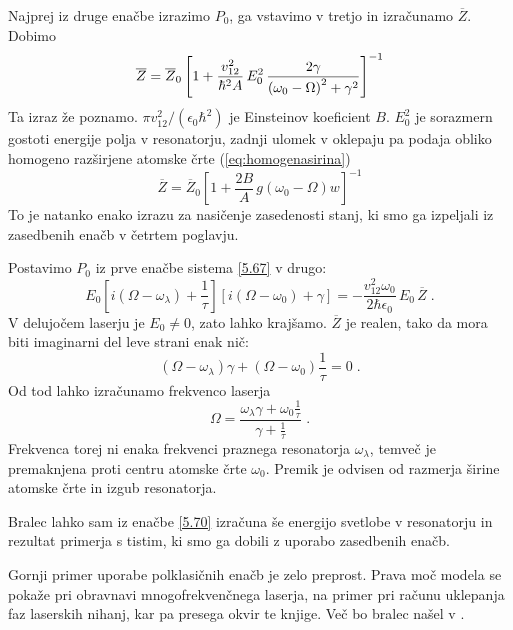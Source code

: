 Najprej iz druge enačbe izrazimo $P_0$, ga vstavimo v tretjo in izračunamo $\overline{Z}$. Dobimo
\begin{equation}  
\label{5.68}
\overline{Z}=\overline{Z}_0\left[1+\frac{v_{12}^2}{\hbar^2 A}\,E_0^2\, \frac{2\gamma}{%
\left(\omega_0-\Omega\right)^2+\gamma^2}\right]^{-1}
\end{equation}
Ta izraz že poznamo. $\pi v_{12}^2/\left(\epsilon_0\hbar^2\right)$ je Einsteinov
koeficient $B$. $E_0^2$ je sorazmern gostoti energije polja v resonatorju,
zadnji ulomek v oklepaju pa podaja obliko homogeno razširjene atomske
črte (\ref{eq:homogenasirina})
\begin{equation}  \label{5.69}
\overline{Z}=\overline{Z}_0\left[1+\frac{2B}{A}\,g\left(\omega_0- \Omega\right)w\right]^{-1}
\end{equation}
To je natanko enako izrazu za nasičenje zasedenosti stanj, ki smo ga
izpeljali iz zasedbenih enačb v četrtem poglavju.

Postavimo $P_0$ iz prve enačbe sistema \ref{5.67} v drugo: 
\begin{equation}  \label{5.70}
E_0[i\left(\Omega-\omega_{\lambda}\right)+\frac{1}{\tau}] [i\left(\Omega- \omega_0\right)
+\gamma]=-\frac{v_{12}^2 \omega_0}{2\hbar\epsilon_0}\,E_0\,\overline{Z}\;.
\end{equation}
V delujočem laserju je $E_0\ne 0$, zato lahko krajšamo. $\overline{Z}$ je
realen, tako da mora biti imaginarni del leve strani enak nič: 
\begin{equation}  \label{5.71}
\left(\Omega- \omega_{\lambda}\right)\gamma+\left(\Omega- \omega_0\right)\frac{1}{\tau} = 0 \;.
\end{equation}
Od tod lahko izračunamo frekvenco laserja 
\begin{equation}  \label{5.72}
\Omega=\frac{\omega_{\lambda}\gamma+ \omega_0\frac{1}{\tau}}{\gamma + \frac{1%
}{\tau}}\;.
\end{equation}
Frekvenca torej ni enaka frekvenci praznega resonatorja $\omega_{\lambda}$,
temveč je premaknjena proti centru atomske črte $\omega_0$. Premik je
odvisen od razmerja širine atomske črte in izgub resonatorja.

Bralec lahko sam iz enačbe \ref{5.70} izračuna še energijo svetlobe v
resonatorju in rezultat primerja s tistim, ki smo ga dobili z uporabo
zasedbenih enačb.

Gornji primer uporabe polklasičnih enačb je zelo preprost. Prava moč
modela se pokaže pri obravnavi mnogofrekvenčnega laserja, na primer pri
računu uklepanja faz laserskih nihanj, kar pa presega okvir te knjige. Več
bo bralec našel v \cite{haken2}.
